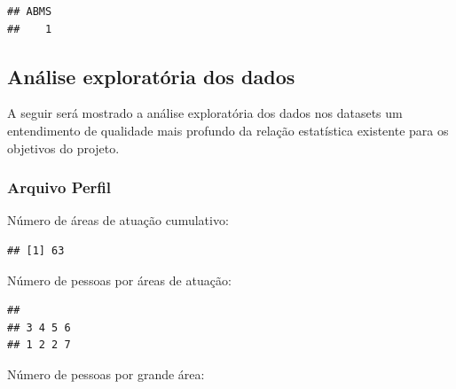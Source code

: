 \documentclass[]{article}
\newenvironment{Shaded}{\begin{snugshade}}{\end{snugshade}}
\newcommand{\ControlFlowTok}[1]{\textcolor[rgb]{0.13,0.29,0.53}{\textbf{#1}}}
\newcommand{\KeywordTok}[1]{\textcolor[rgb]{0.13,0.29,0.53}{\textbf{#1}}}
\newcommand{\NormalTok}[1]{#1}
\newcommand{\OperatorTok}[1]{\textcolor[rgb]{0.81,0.36,0.00}{\textbf{#1}}}
\begin{document}
\begin{verbatim}
## ABMS 
##    1
\end{verbatim}

\hypertarget{anuxe1lise-exploratuxf3ria-dos-dados}{%
\subsection{Análise exploratória dos
dados}\label{anuxe1lise-exploratuxf3ria-dos-dados}}

A seguir será mostrado a análise exploratória dos dados nos datasets um
entendimento de qualidade mais profundo da relação estatística existente
para os objetivos do projeto.

\hypertarget{arquivo-perfil}{%
\subsubsection{Arquivo Perfil}\label{arquivo-perfil}}

Número de áreas de atuação cumulativo:

\begin{Shaded}
\end{Shaded}

\begin{verbatim}
## [1] 63
\end{verbatim}

Número de pessoas por áreas de atuação:

\begin{Shaded}
\end{Shaded}

\begin{verbatim}
## 
## 3 4 5 6 
## 1 2 2 7
\end{verbatim}

Número de pessoas por grande área:

\begin{Shaded}
\end{Shaded}
\end{document}
